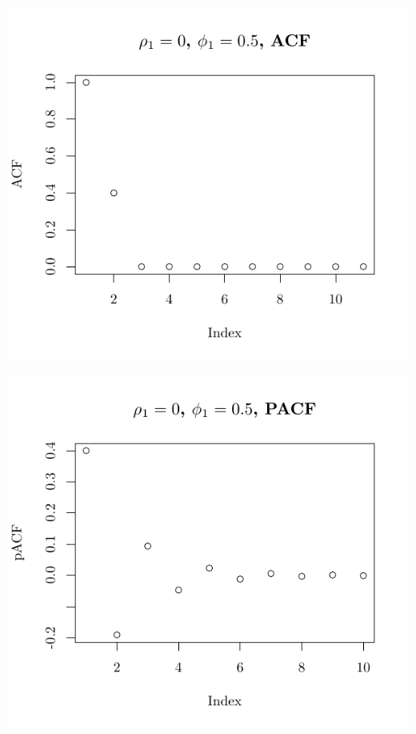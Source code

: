 \documentclass[10pt]{paper}\usepackage[]{graphicx}\usepackage[]{color}
\makeatletter
\def\maxwidth{ %
  \ifdim\Gin@nat@width>\linewidth
    \linewidth
  \else
    \Gin@nat@width
  \fi
}
\newenvironment{knitrout}{}{} %
\makeatother
\begin{document}
\begin{knitrout}
{\centering \includegraphics[width=\maxwidth]{figure/graphics-plotter-19} 

}




{\centering \includegraphics[width=\maxwidth]{figure/graphics-plotter-20} 

}





\end{knitrout}
\end{document}
